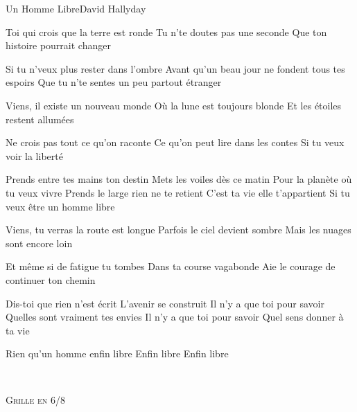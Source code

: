 \documentclass[a4paper,11pt,french]{article}
\begin{document}
\begin{Song}{Un Homme Libre}{David Hallyday}
\begin{multicols}{2}
\begin{Verse}
Toi qui crois que la terre est ronde
Tu n'te doutes pas une seconde
Que ton histoire pourrait changer
\espaceInterStrophe

Si tu n'veux plus rester dans l'ombre
Avant qu'un beau jour ne fondent tous tes espoirs
Que tu n'te sentes un peu partout étranger
\espaceInterStrophe

Viens, il existe un nouveau monde
Où la lune est toujours blonde
Et les étoiles restent allumées
\espaceInterStrophe

Ne crois pas tout ce qu'on raconte
Ce qu'on peut lire dans les contes
Si tu veux voir la liberté
\end{Verse}
\espaceInterStrophe

\begin{Chorus}
Prends entre tes mains ton destin
Mets les voiles dès ce matin
Pour la planète où tu veux vivre
Prends le large rien ne te retient
C'est ta vie elle t'appartient
Si tu veux être un homme libre
\end{Chorus}
\espaceInterStrophe

\begin{Verse}
Viens, tu verras la route est longue
Parfois le ciel devient sombre
Mais les nuages sont encore loin
\espaceInterStrophe

Et même si de fatigue tu tombes
Dans ta course vagabonde
Aie le courage de continuer ton chemin
\end{Verse}
\espaceInterStrophe

\begin{Bridge}
Dis-toi que rien n'est écrit
L'avenir se construit
Il n'y a que toi pour savoir 
Quelles sont vraiment tes envies
Il n'y a que toi pour savoir 
Quel sens donner à ta vie
\end{Bridge}
\espaceInterStrophe

\aurefrain
\espaceInterStrophe

\begin{Chorus}
Rien qu'un homme enfin libre
Enfin libre
Enfin libre
\end{Chorus}
\vfill
~
\end{multicols}

\vfill

\begin{multicols}{2}

\textsc{Grille en 6/8}\\


\end{multicols}
\end{Song}
\end{document}
